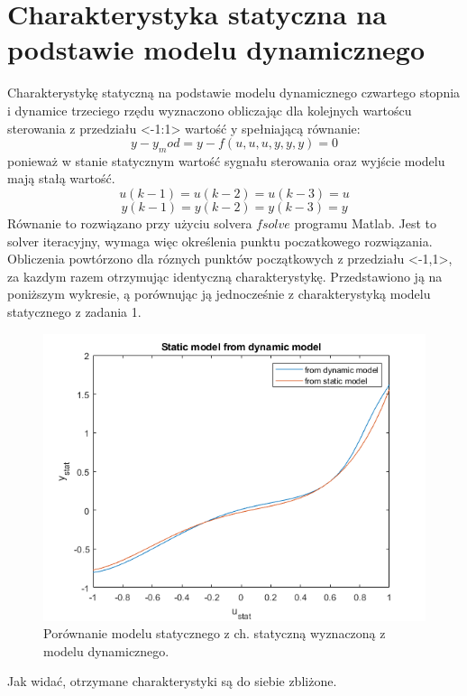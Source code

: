 \section{Charakterystyka statyczna na podstawie modelu dynamicznego}
Charakterystykę statyczną na podstawie modelu dynamicznego czwartego stopnia i dynamice trzeciego rzędu wyznaczono obliczając dla kolejnych wartoścu sterowania z przedziału <-1:1> wartość y spełniającą równanie:
\begin{equation}
y - y_mod = y - f(u,u,u,y,y,y)=0
\end{equation}
ponieważ w stanie statycznym wartość sygnału sterowania oraz wyjście modelu mają stałą wartość.
\begin{equation}
u(k-1)=u(k-2)=u(k-3)=u
\end{equation}
\begin{equation}
y(k-1)=y(k-2)=y(k-3)=y
\end{equation}
Równanie to rozwiązano przy użyciu solvera $fsolve$ programu Matlab. Jest to solver iteracyjny, wymaga więc określenia punktu poczatkowego rozwiązania. Obliczenia powtórzono dla róznych punktów początkowych z przedziału <-1,1>, za kazdym razem otrzymując identyczną charakterystykę. Przedstawiono ją na poniższym wykresie, ą porównując ją jednocześnie z charakterystyką modelu statycznego z zadania 1.
\begin{figure}[H]
\centering
\includegraphics[width=15cm]{images/static_dynamic.png}
\caption{Porównanie modelu statycznego z ch. statyczną wyznaczoną z modelu dynamicznego.}
\label{fig:static_dynamic}
\end{figure}
Jak widać, otrzymane charakterystyki są do siebie zbliżone. \\
